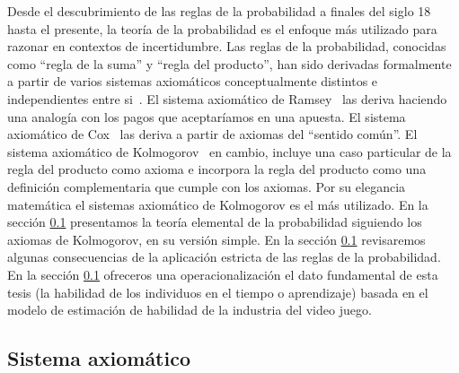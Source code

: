 \documentclass[a4paper,11pt]{book}
\theoremstyle{definition}
\begin{document}
Desde el descubrimiento de las reglas de la probabilidad a finales del siglo 18 hasta el presente, la teor\'ia de la probabilidad es el enfoque m\'as utilizado para razonar en contextos de incertidumbre.
%
Las reglas de la probabilidad, conocidas como ``regla de la suma'' y ``regla del producto'', han sido derivadas formalmente a partir de varios sistemas axiom\'aticos conceptualmente distintos e independientes entre si~\cite{halpern2017}.
%
El sistema axiom\'atico de Ramsey~\cite{Ramsey1926} las deriva haciendo una analog\'ia con los pagos que aceptar\'iamos en una apuesta.
%
El sistema axiom\'atico de Cox~\cite{Cox1946} las deriva a partir de axiomas del ``sentido com\'un''.
%
El sistema axiom\'atico de Kolmogorov~\cite{Kolmogorov1950} en cambio, incluye una caso particular de la regla del producto como axioma e incorpora la regla del producto como una definici\'on complementaria que cumple con los axiomas.
%
Por su elegancia matem\'atica el sistemas axiom\'atico de Kolmogorov es el m\'as utilizado.
%
En la secci\'on \ref{} presentamos la teor\'ia elemental de la probabilidad siguiendo los axiomas de Kolmogorov, en su versi\'on simple.
%
En la secci\'on \ref{} revisaremos algunas consecuencias de la aplicaci\'on estricta de las reglas de la probabilidad.
%
En la secci\'on \ref{} ofreceros una operacionalizaci\'on el dato fundamental de esta tesis (la habilidad de los individuos en el tiempo o aprendizaje) basada en el modelo de estimaci\'on de habilidad de la industria del video juego.


\subsection{Sistema axiom\'atico}
\end{document}

